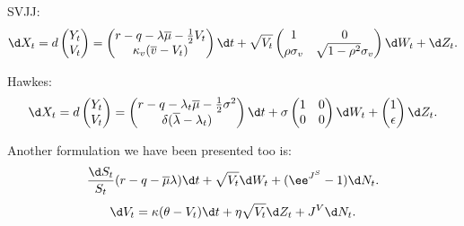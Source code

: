 
SVJJ:
\[ 
\d X_t = d \begin{pmatrix}
Y_t\\
V_t
\end{pmatrix}
= \begin{pmatrix}
r-q-\lambda \overline{\mu}-\frac{1}{2} V_t\\
\kappa_v (\overline{v} - V_t)
\end{pmatrix}
\d t
+ \sqrt{V_t}
\begin{pmatrix}
1 & 0\\
\rho \sigma_v& \sqrt{1-\rho^2 }\sigma_v
\end{pmatrix} \d W_t
+ \d Z_t
.\]

Hawkes:
\[ 
\d X_t = d \begin{pmatrix}
Y_t\\
V_t
\end{pmatrix}
= \begin{pmatrix}
r-q-\lambda_t \overline{\mu} - \frac{1}{2} \sigma^2 \\
\delta(\overline{\lambda} - \lambda_t)
\end{pmatrix} \d t
+ \sigma \begin{pmatrix}
1 & 0\\
0 & 0
\end{pmatrix}
\d W_t
+ \begin{pmatrix}
1\\
\epsilon
\end{pmatrix}
\d Z_t
.\]


Another formulation we have been presented too is:
\[ 
\frac{\d S_t}{S_t}  (r-q- \overline{\mu} \lambda) \d t + \sqrt{V_t}\d W_t + (\ee^{J^{S}}-1) \d N_t
.\]
\[ 
\d V_t = \kappa(\theta - V_t) \d t + \eta \sqrt{V_t}\d Z_t + J^{V}\d N_t
.\]






